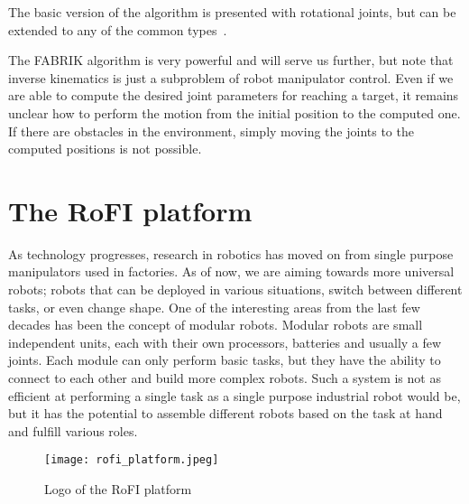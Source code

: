 The basic version of the algorithm is presented with rotational joints, but can be extended to any of the common types~\cite{fabrikConstraints}.

The FABRIK algorithm is very powerful and will serve us further, but note that inverse kinematics is just a subproblem of robot manipulator control. Even if we are able to compute the desired joint parameters for reaching a target, it remains unclear how to perform the motion from the initial position to the computed one. If there are obstacles in the environment, simply moving the joints to the computed positions is not possible.

\section{The RoFI platform}

As technology progresses, research in robotics has moved on from single purpose manipulators used in factories. As of now, we are aiming towards more universal robots; robots that can be deployed in various situations, switch between different tasks, or even change shape. One of the interesting areas from the last few decades has been the concept of modular robots. Modular robots are small independent units, each with their own processors, batteries and usually a few joints. Each module can only perform basic tasks, but they have the ability to connect to each other and build more complex robots. Such a system is not as efficient at performing a single task as a single purpose industrial robot would be, but it has the potential to assemble different robots based on the task at hand and fulfill various roles.


\begin{figure}
    \centering
    \texttt{[image: rofi\_platform.jpeg]}
  \caption{Logo of the RoFI platform~\cite{rofiPlatform}}
\end{figure}
